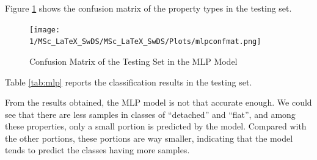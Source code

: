 \documentclass[11pt,twoside]{article}
\numberwithin{Theorem}{section}
\numberwithin{Definition}{section}
\numberwithin{Lemma}{section}
\numberwithin{Algorithm}{section}
\numberwithin{equation}{section}
\begin{document}
Figure \ref{fig:mlpconf} shows the confusion matrix of the property types in the testing set.

\begin{figure}[h]
\centering
\texttt{[image: 1/MSc\_LaTeX\_SwDS/MSc\_LaTeX\_SwDS/Plots/mlpconfmat.png]}
\caption{Confusion Matrix of the Testing Set in the MLP Model}
\label{fig:mlpconf}
\end{figure}

Table \ref{tab:mlp} reports the classification results in the testing set.

\begin{table}[h]
\centering


\caption{Classification Report of the MLP Model}
\label{tab:mlp}

\end{table}
From the results obtained, the MLP model is not that accurate enough. We could see that there are less samples in classes of  “detached” and  “flat”, and among these properties, only a small portion is predicted by the model. Compared with the other portions, these portions are way smaller, indicating that the model tends to predict the classes having more samples. 
\end{document}
